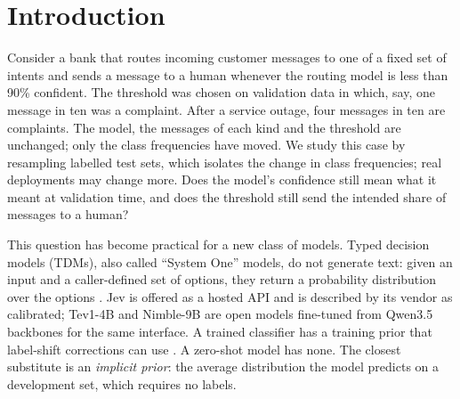\section{Introduction}
\label{sec:intro}

Consider a bank that routes incoming customer messages to one of a fixed set of intents and sends a message to a
human whenever the routing model is less than 90\% confident. The threshold was chosen on validation data in which,
say, one message in ten was a complaint. After a service outage, four messages in ten are complaints. The model,
the messages of each kind and the threshold are unchanged; only the class frequencies have moved. We study this case
by resampling labelled test sets, which isolates the change in class frequencies; real deployments may change more.
Does the model's
confidence still mean what it meant at validation time, and does the threshold still send the intended share of
messages to a human?

This question has become practical for a new class of models. Typed decision models (TDMs), also called
``System One'' models, do not generate text: given an input and a caller-defined set of options, they return a
probability distribution over the options \citep{deusser2026jev,tang2026audit}. Jev is offered as a hosted API and
is described by its vendor as calibrated; Tev1-4B and Nimble-9B are open models fine-tuned from Qwen3.5 backbones
for the same interface. A trained classifier has a training prior that label-shift corrections can use
\citep{saerens2002adjusting,lipton2018detecting}. A zero-shot model has none. The closest substitute is an
\emph{implicit prior}: the average distribution the model predicts on a development set, which requires no labels.

